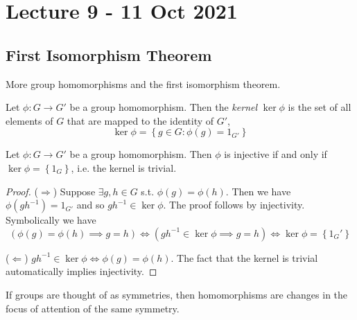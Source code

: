 \section{Lecture 9 - 11 Oct 2021}
\subsection{First Isomorphism Theorem}
More group homomorphisms and the first isomorphism theorem.
\begin{definition} 
  Let $\phi:G\to G'$ be a group homomorphism. Then the \emph{kernel} $\ker\phi$ is the set
  of all elements of $G$ that are mapped to the identity of $G'$, 
  \[\ker \phi = \left\{ g\in G : \phi(g)=1_{G'} \right\}\]
  \label{kernel}
\end{definition}

\begin{theorem}
  Let $\phi:G\to G'$ be a group homomorphism. Then $\phi$ is injective if and only if
  $\ker \phi = \left\{ 1_G \right\}$, i.e. the kernel is trivial.
  \label{kernelHomomorphism}
\end{theorem}
\begin{proof}
  ($\Rightarrow$) Suppose $\exists g,h\in G$ s.t. $\phi(g)=\phi(h)$. Then we have
  $\phi(gh^{-1})=1_{G'}$ and so $gh^{-1}\in\ker\phi$. The proof follows by injectivity. 
  Symbolically we have
  \[ (\phi(g)=\phi(h) \implies g=h) \iff (gh^{-1}\in\ker\phi \implies g=h) \iff \ker\phi
  = \left\{ 1_G' \right\}\]

  ($\Leftarrow$) $gh^{-1}\in\ker\phi \iff \phi(g)=\phi(h)$. The fact that the kernel is
  trivial automatically implies injectivity.
\end{proof}

\begin{remark} 
  If groups are thought of as symmetries, then homomorphisms are changes in the focus of
  attention of the same symmetry.
\end{remark}

